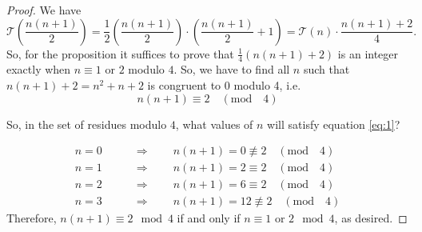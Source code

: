 \documentclass{amsart}
\theoremstyle{definition}
\newcommand{\tri}{\mathcal T}
\begin{document}
\begin{proof}
We have
\[
    \tri\left( \frac{n(n+1)}{2}\right) = \frac{1}{2} \left(\frac{n(n+1)}{2}\right) \cdot \left(\frac{n(n+1)}{2} + 1\right) 
    = \tri(n) \cdot \frac{n(n+1) + 2}{4}.
\]
So, for the proposition it suffices to prove that  $\frac{1}{4}(n(n+1) + 2)$ is an integer exactly when $n \equiv 1$ or $2$ modulo $ 4$.
So, we have to find all $n$ such that $n(n+1) + 2 = n^2 + n + 2$ is congruent to 0 modulo 4, i.e.
\begin{equation}
    \label{eq:1} n(n+1) \equiv 2 \quad(\mathrm{mod}\quad 4)
\end{equation}

So, in the set of residues modulo $4$, what values of $n$ will satisfy equation \eqref{eq:1}? 

\begin{align*}
   n = 0 &\qquad\Rightarrow\qquad  n(n+1) = 0 \not\equiv 2 \quad(\mathrm{mod}\quad 4) \\
    n = 1 &\qquad\Rightarrow\qquad n(n+1) = 2 \equiv 2 \quad(\mathrm{mod}\quad 4) \\
    n = 2 &\qquad\Rightarrow\qquad n(n+1) = 6 \equiv 2 \quad(\mathrm{mod}\quad 4) \\
    n = 3 &\qquad\Rightarrow\qquad n(n+1) = 12 \not\equiv 2 \quad(\mathrm{mod}\quad 4)
\end{align*}
Therefore, $n(n+1) \equiv 2 \mod 4$ if and only if $n \equiv 1$ or $2 \mod 4$,
as desired.
%
\end{proof}
\end{document}
